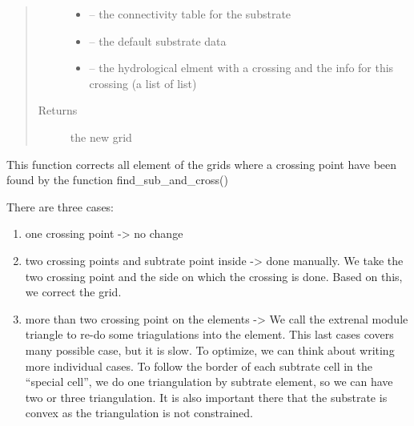 \documentclass[letterpaper,10pt,english]{sphinxmanual}
\begin{document}
\begin{fulllineitems}
\begin{quote}
\begin{description}
\begin{itemize}
\item {} 
 -- the connectivity table for the substrate

\item {} 
 -- the default substrate data

\item {} 
 -- the hydrological elment with a crossing and the info for this crossing (a list of list)

\end{itemize}

\item[{Returns}] \leavevmode
the new grid

\end{description}\end{quote}


This function corrects all element of the grids where a crossing point have been found by the
function find\_sub\_and\_cross()

There are three cases:
\begin{enumerate}
\item {} 
one crossing point -\textgreater{} no change

\item {} 
two crossing points and subtrate point inside -\textgreater{} done manually. We take the two crossing point and the side on
which the crossing is done. Based on this, we correct the grid.

\item {} 
more than two crossing point on the elements -\textgreater{} We call the extrenal module
triangle to re-do some triagulations into the element. This last cases covers many possible case, but it is slow.
To optimize, we can think about writing more individual cases. To follow the border of each subtrate cell in
the ``special cell'', we do one triangulation by subtrate element, so we can have two or three triangulation.
It is also important there that the substrate is convex as the triangulation is not constrained.

\end{enumerate}

\end{fulllineitems}

\end{document}

